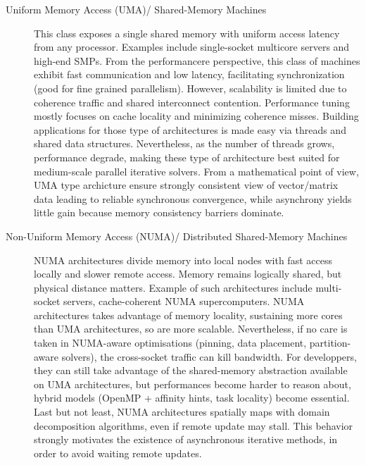 \begin{description}
\item[Uniform Memory Access (UMA)/ Shared-Memory Machines] This class exposes a single shared memory with uniform access latency from any processor. Examples include single-socket multicore servers and high-end SMPs. From the performancere perspective, this class of machines exhibit fast communication and low latency, facilitating synchronization (good for fine grained parallelism). However, scalability is limited due to coherence traffic and shared interconnect contention. Performance tuning mostly focuses on cache locality and minimizing coherence misses. Building applications for those type of architectures is made easy via threads and shared data structures. Nevertheless, as the number of threads grows, performance degrade, making these type of architecture best suited for medium-scale parallel iterative solvers. From a mathematical point of view, UMA type archicture ensure strongly consistent view of vector/matrix data leading to reliable synchronous convergence, while asynchrony yields little gain because memory consistency barriers dominate. 


\item[Non-Uniform Memory Access (NUMA)/ Distributed Shared-Memory Machines] 
NUMA architectures divide memory into local nodes with fast access locally and slower remote access. Memory remains logically shared, but physical distance matters. Example of such architectures include multi-socket servers, cache-coherent NUMA supercomputers. NUMA architectures takes advantage of memory locality, sustaining more cores than UMA architectures, so are more scalable. Nevertheless, if no care is taken in NUMA-aware optimisations (pinning, data placement, partition-aware solvers), the cross-socket traffic can kill bandwidth. For developpers, they can still take advantage of the shared-memory abstraction available on UMA architectures, but performances become harder to reason about, hybrid models (OpenMP + affinity hints, task locality) become essential. Last but not least, NUMA architectures spatially maps with domain decomposition algorithms, even if remote update may stall. This behavior strongly motivates the existence of asynchronous iterative methods, in order to avoid waiting remote updates.



\end{description}
